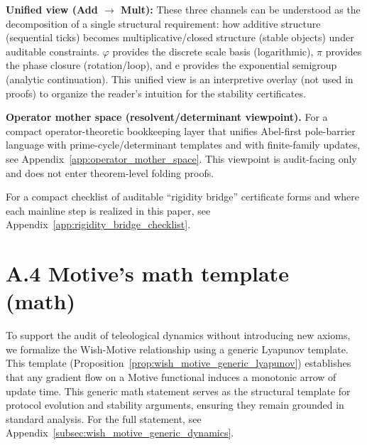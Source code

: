\AuditTag \textbf{Unified view (Add $\to$ Mult):}
These three channels can be understood as the decomposition of a single structural requirement: how additive structure (sequential ticks) becomes multiplicative/closed structure (stable objects) under auditable constraints.
$\varphi$ provides the discrete scale basis (logarithmic), $\pi$ provides the phase closure (rotation/loop), and $\mathrm{e}$ provides the exponential semigroup (analytic continuation).
This unified view is an interpretive overlay (not used in proofs) to organize the reader's intuition for the stability certificates.

\AuditTag \textbf{Operator mother space (resolvent/determinant viewpoint).}
For a compact operator-theoretic bookkeeping layer that unifies Abel-first pole-barrier language with prime-cycle/determinant templates and with finite-family updates, see Appendix~\ref{app:operator_mother_space}.
This viewpoint is audit-facing only and does not enter theorem-level folding proofs.

For a compact checklist of auditable ``rigidity bridge'' certificate forms and where each mainline step is realized in this paper, see Appendix~\ref{app:rigidity_bridge_checklist}.

\section*{A.4 Motive's math template (math)}

\MathTag To support the audit of teleological dynamics without introducing new axioms, we formalize the Wish-Motive relationship using a generic Lyapunov template.
This template (Proposition~\ref{prop:wish_motive_generic_lyapunov}) establishes that any gradient flow on a Motive functional induces a monotonic arrow of update time.
This generic math statement serves as the structural template for protocol evolution and stability arguments, ensuring they remain grounded in standard analysis.
For the full statement, see Appendix~\ref{subsec:wish_motive_generic_dynamics}.



